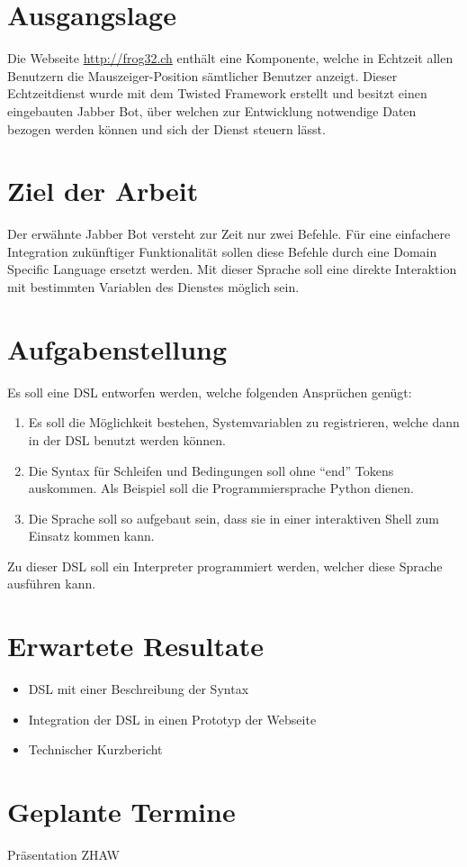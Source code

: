 \section{Ausgangslage}
\label{sec:Ausgangslage}
Die Webseite \url{http://frog32.ch} enthält eine Komponente, welche in Echtzeit allen Benutzern die Mauszeiger-Position sämtlicher Benutzer anzeigt. Dieser Echtzeitdienst wurde mit dem Twisted Framework erstellt und besitzt einen eingebauten Jabber Bot, über welchen zur Entwicklung notwendige Daten bezogen werden können und sich der Dienst steuern lässt.

\section{Ziel der Arbeit}
\label{sec:Ziel der Arbeit}
Der erwähnte Jabber Bot versteht zur Zeit nur zwei Befehle. Für eine einfachere Integration zukünftiger Funktionalität sollen diese Befehle durch eine Domain Specific Language ersetzt werden. Mit dieser Sprache soll eine direkte Interaktion mit bestimmten Variablen des Dienstes möglich sein.

\section{Aufgabenstellung}

\label{sec:Aufgabenstellung}
Es soll eine DSL entworfen werden, welche folgenden Ansprüchen genügt:

\begin{enumerate}
  \item Es soll die Möglichkeit bestehen, Systemvariablen zu registrieren, welche dann in der DSL benutzt werden können.
  \item Die Syntax für Schleifen und Bedingungen soll ohne ``end'' Tokens auskommen. Als Beispiel soll die Programmiersprache Python dienen.
  \item Die Sprache soll so aufgebaut sein, dass sie in einer interaktiven Shell zum Einsatz kommen kann.
\end{enumerate}

Zu dieser DSL soll ein Interpreter programmiert werden, welcher diese Sprache ausführen kann.

\section{Erwartete Resultate}
\label{sec:Erwartete Resultate}

\begin{itemize}
  \item DSL mit einer Beschreibung der Syntax
  \item Integration der DSL in einen Prototyp der Webseite
  \item Technischer Kurzbericht
\end{itemize}

\section{Geplante Termine}
\label{sec:Geplante Termine}
Präsentation ZHAW